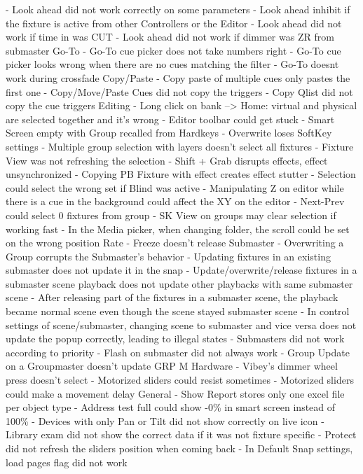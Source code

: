 \documentclass[
]{article}
\begin{document}
- Look ahead did not work correctly on some parameters
- Look ahead inhibit if the fixture is active from other Controllers or the Editor
- Look ahead did not work if time in was CUT
- Look ahead did not work if dimmer was ZR from submaster
Go-To
- Go-To cue picker does not take numbers right
- Go-To cue picker looks wrong when there are no cues matching the filter
- Go-To doesnt work during crossfade
Copy/Paste
- Copy paste of multiple cues only pastes the first one
- Copy/Move/Paste Cues did not copy the triggers
- Copy Qlist did not copy the cue triggers
Editing
- Long click on bank --\textgreater{} Home: virtual and physical are selected together and it's wrong
- Editor toolbar could get stuck
- Smart Screen empty with Group recalled from Hardkeys
- Overwrite loses SoftKey settings
- Multiple group selection with layers doesn't select all fixtures
- Fixture View was not refreshing the selection
- Shift + Grab disrupts effects, effect unsynchronized
- Copying PB Fixture with effect creates effect stutter
- Selection could select the wrong set if Blind was active
- Manipulating Z on editor while there is a cue in the background could affect the XY on the editor
- Next-Prev could select 0 fixtures from group
- SK View on groups may clear selection if working fast
- In the Media picker, when changing folder, the scroll could be set on the wrong position
Rate
- Freeze doesn't release
Submaster
- Overwriting a Group corrupts the Submaster's behavior
- Updating fixtures in an existing submaster does not update it in the snap
- Update/overwrite/release fixtures in a submaster scene playback does not update other playbacks with same submaster scene
- After releasing part of the fixtures in a submaster scene, the playback became normal scene even though the scene stayed submaster scene
- In control settings of scene/submaster, changing scene to submaster and vice versa does not update the popup correctly, leading to illegal states
- Submasters did not work according to priority
- Flash on submaster did not always work
- Group Update on a Groupmaster doesn't update GRP M
Hardware
- Vibey's dimmer wheel press doesn't select
- Motorized sliders could resist sometimes
- Motorized sliders could make a movement delay
General
- Show Report stores only one excel file per object type
- Address test full could show -0\% in smart screen instead of 100\%
- Devices with only Pan or Tilt did not show correctly on live icon
- Library exam did not show the correct data if it was not fixture specific
- Protect did not refresh the sliders position when coming back
- In Default Snap settings, load pages flag did not work
\end{document}
